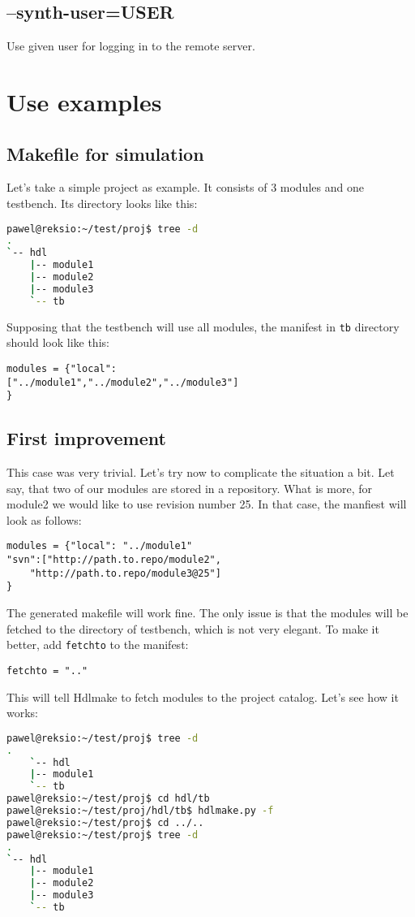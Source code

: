 \documentclass[a4paper,11pt]{article}
\begin{document}
\subsection*{--synth-user=USER}
Use given user for logging in to the remote server.
\section{Use examples}
\subsection{Makefile for simulation}
Let's take a simple project as example. It consists of 3 modules and one testbench. Its directory looks like this:
\begin{lstlisting}[language=bash]
pawel@reksio:~/test/proj$ tree -d
.
`-- hdl
    |-- module1
    |-- module2
    |-- module3
    `-- tb
\end{lstlisting}
Supposing that the testbench will use all modules, the manifest in \verb!tb! directory should look like this:
\begin{lstlisting}
modules = {"local":
["../module1","../module2","../module3"]
}
\end{lstlisting}
\subsection*{First improvement}
This case was very trivial. Let's try now to complicate the situation a bit. Let say, that two of our modules are stored in a repository. What is more, for module2 we would like to use revision number 25. In that case, the manfiest will look as follows:
\begin{lstlisting}
modules = {"local": "../module1"
"svn":["http://path.to.repo/module2",
    "http://path.to.repo/module3@25"]
}
\end{lstlisting}
The generated makefile will work fine. The only issue is that the modules will be fetched to the directory of testbench, which is not very elegant. To make it better, add \verb!fetchto! to the manifest:
\begin{lstlisting}
fetchto = ".."
\end{lstlisting}
This will tell Hdlmake to fetch modules to the project catalog. Let's see how it works:
\begin{lstlisting}[language=bash]
pawel@reksio:~/test/proj$ tree -d
.
    `-- hdl
    |-- module1
    `-- tb
pawel@reksio:~/test/proj$ cd hdl/tb
pawel@reksio:~/test/proj/hdl/tb$ hdlmake.py -f
pawel@reksio:~/test/proj$ cd ../..
pawel@reksio:~/test/proj$ tree -d
.
`-- hdl
    |-- module1
    |-- module2
    |-- module3
    `-- tb
\end{lstlisting}
\end{document}
